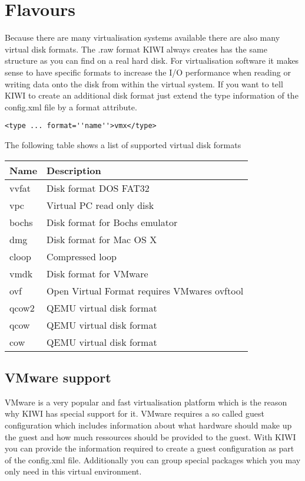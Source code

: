 \section{Flavours}

Because there are many virtualisation systems available there are also
many virtual disk formats. The .raw format KIWI always creates has the
same structure as you can find on a real hard disk. For virtualisation
software it makes sense to have specific formats to increase the
I/O performance when reading or writing data onto the disk from within
the virtual system. If you want to tell KIWI to create an additional
disk format just extend the type information of the config.xml file
by a format attribute.

\begin{Command}{12cm}
\begin{verbatim}
<type ... format=''name''>vmx</type>
\end{verbatim}
\end{Command}

The following table shows a list of supported virtual disk formats

\begin{tabular}[h]{|p{2cm}|p{9cm}|}
\hline
\textbf{Name} & \textbf{Description} \\
\hline
vvfat       & Disk format DOS FAT32 \\
vpc         & Virtual PC read only disk  \\
bochs       & Disk format for Bochs emulator  \\
dmg         & Disk format for Mac OS X \\
cloop       & Compressed loop \\
vmdk        & Disk format for VMware \\
ovf         & Open Virtual Format requires VMwares ovftool \\
qcow2       & QEMU virtual disk format  \\
qcow        & QEMU virtual disk format  \\
cow         & QEMU virtual disk format \\
\hline
\end{tabular}

\subsection{VMware support}

VMware is a very popular and fast virtualisation platform which is
the reason why KIWI has special support for it. VMware requires a
so called guest configuration which includes information about what
hardware should make up the guest and how much ressources should be
provided to the guest. With KIWI you can provide the information
required to create a guest configuration as part of the config.xml
file. Additionally you can group special packages which you may only
need in this virtual environment.

